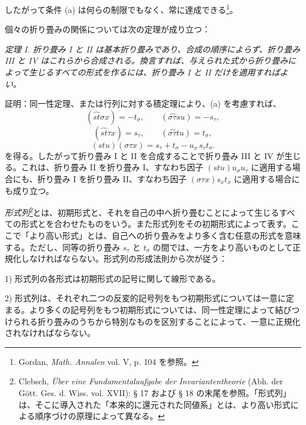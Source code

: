\documentclass[11pt]{jlreq}
\begin{document}
したがって条件 (a) は何らの制限でもなく、常に達成できる\footnote{Gordan, \emph{Math. Annalen} vol. V, p. 104 を参照。}。

個々の折り畳みの関係については次の定理が成り立つ：

\emph{定理 I. 折り畳み I と II は基本折り畳みであり、合成の順序によらず、折り畳み III と IV はこれらから合成される。換言すれば、与えられた式から折り畳みによって生じるすべての形式を作るには、折り畳み I と II だけを適用すればよい。}

証明：同一性定理、または行列に対する積定理により、(a) を考慮すれば、
\[
(\widehat{st}\sigma x)=-t_\sigma,\qquad
(\widehat{\sigma\tau}su)=-s_\tau,
\]
\[
(\widehat{st}\tau x)=s_\tau,\qquad
(\widehat{\sigma\tau}tu)=t_\sigma,
\]
\[
(stu)(\sigma\tau x)=s_\tau+t_\sigma-u_x\,s_\tau t_\sigma .
\]
を得る。したがって折り畳み I と II を合成することで折り畳み III と IV が生じる。これは、折り畳み II を折り畳み I、すなわち因子 $(stu)u_\sigma u_\tau$ に適用する場合にも、折り畳み I を折り畳み II、すなわち因子 $(\sigma\tau x)s_xt_x$ に適用する場合にも成り立つ。

\emph{形式列}\footnote{Clebsch, \emph{Über eine Fundamentalaufgabe der Invariantentheorie} (Abh. der Gött. Ges. d. Wiss. vol. XVII): § 17 および § 18 の末尾を参照。「形式列」は、そこに導入された「本来的に還元された同値系」とは、より高い形式による順序づけの原理によって異なる。}とは、初期形式と、それを自己の中へ折り畳むことによって生じるすべての形式とを合わせたものをいう。また形式列をその初期形式によって表す。ここで「より高い形式」とは、自己への折り畳みをより多く含む任意の形式を意味する。ただし、同等の折り畳み $s_\tau$ と $t_\sigma$ の間では、一方をより高いものとして正規化しなければならない。形式列の形成法則から次が従う：

1) 形式列の各形式は初期形式の記号に関して線形である。

2) 形式列は、それぞれ二つの反変的記号列をもつ初期形式については一意に定まる。より多くの記号列をもつ初期形式については、同一性定理によって結びつけられる折り畳みのうちから特別なものを区別することによって、一意に正規化されなければならない。
\end{document}
